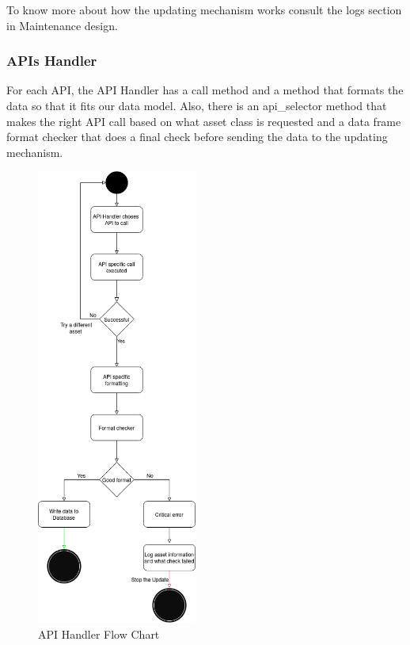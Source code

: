 \documentclass[main.tex]{subfiles}
\begin{document}
To know more about how the updating mechanism works consult the logs section in Maintenance design.


\subsubsection{APIs Handler}
For each API, the API Handler has a call method and a method that formats the data so that it fits our data model. Also, there is an api\_selector method that makes the right API call based on what asset class is requested and a data frame format checker that does a final check before sending the data to the updating mechanism. 


\begin{figure}[H]
    \centering
    \caption{API Handler Flow Chart\cite{TR}}
    \includegraphics[width=0.47\textwidth]{04Design/04Pictures/api_handler_v3.png}
\end{figure}
\end{document}
